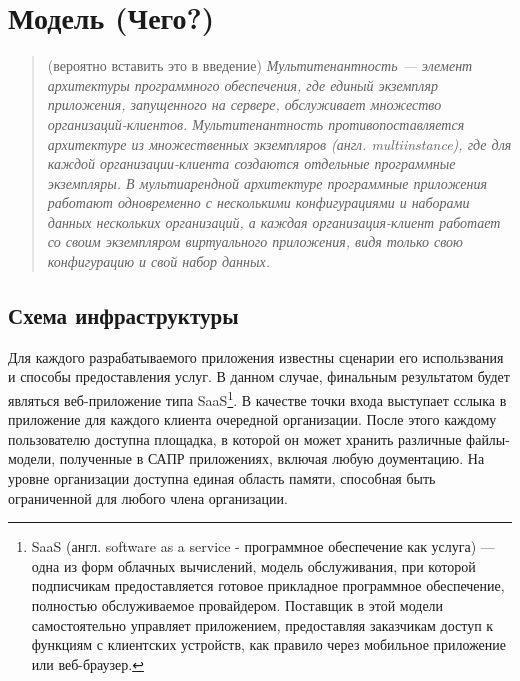 \section{Модель (Чего?)} 

\begin{quote}
(вероятно вставить это в введение)
\itshape{\large Мультитенантность} --- элемент архитектуры программного обеспечения, где единый экземпляр приложения, запущенного на сервере, обслуживает множество организаций-клиентов. Мультитенантность противопоставляется архитектуре из множественных экземпляров (англ. multiinstance), где для каждой организации-клиента создаются отдельные программные экземпляры. В мультиарендной архитектуре программные приложения работают одновременно с несколькими конфигурациями и наборами данных нескольких организаций, а каждая организация-клиент работает со своим экземпляром виртуального приложения, видя только свою конфигурацию и свой набор данных.
\end{quote}



\vspace{6pt}

\subsection{Схема инфраструктуры}
Для каждого разрабатываемого приложения известны сценарии его использвания и способы предоставления услуг. В данном случае, финальным результатом будет являться веб-приложение типа SaaS\footnote{%
	SaaS (англ. software as a service - программное обеспечение как услуга) --- одна из форм облачных вычислений, модель обслуживания, при которой подписчикам предоставляется готовое прикладное программное обеспечение, полностью обслуживаемое провайдером. Поставщик в этой модели самостоятельно управляет приложением, предоставляя заказчикам доступ к функциям с клиентских устройств, как правило через мобильное приложение или веб-браузер.
}. В качестве точки входа выступает сслыка в приложение для каждого клиента очередной организации. После этого каждому пользователю доступна площадка, в которой он может хранить различные файлы-модели, полученные в САПР приложениях, включая любую доументацию. На уровне организации доступна единая область памяти, способная быть ограниченной для любого члена организации. 

